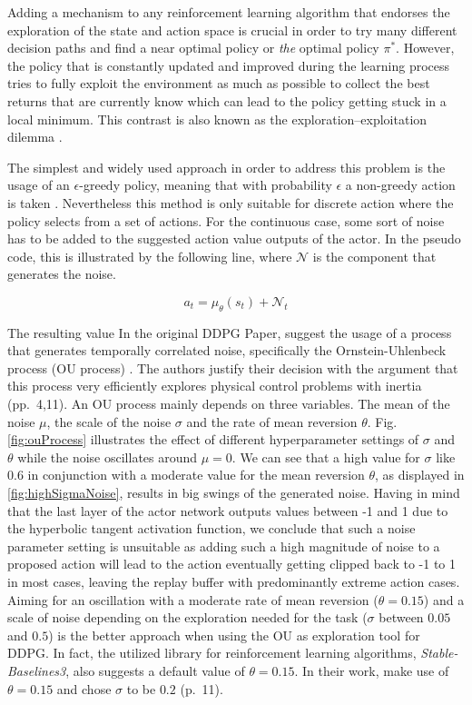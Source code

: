 Adding a mechanism to any reinforcement learning algorithm that endorses the exploration of the state and action space is crucial in order to try many different decision paths and find a near optimal policy or \textit{the} optimal policy $\pi^*$. However, the policy that is constantly updated and improved during the learning process tries to fully exploit the environment as much as possible to collect the best returns that are currently know which can lead to the policy getting stuck in a local minimum. This contrast is also known as the exploration–exploitation dilemma \cite[p.~3]{Sutton1998}.
\par
The simplest and widely used approach in order to address this problem is the usage of an $\epsilon$-greedy policy, meaning that with probability $\epsilon$ a non-greedy action is taken \cite[p.~100]{Sutton1998}. Nevertheless this method is only suitable for discrete action where the policy selects from a set of actions. For the continuous case, some sort of noise has to be added to the suggested action value outputs of the actor. In the pseudo code, this is illustrated by the following line, where $\mathcal{N}$ is the component that generates the noise.
\par
\begin{equation*}
    a_t = \mu_\theta(s_t) + \mathcal{N}_t
\end{equation*}
\par 
The resulting value 
In the original DDPG Paper, \cite{lillicrap2019continuous} suggest the usage of a process that generates temporally correlated noise, specifically the Ornstein-Uhlenbeck process (OU process) \cite[]{uhlenbeck1930theory}. The authors justify their decision with the argument that this process very efficiently explores physical control problems with inertia (pp.~4,11). An OU process mainly depends on three variables. The mean of the noise $\mu$, the scale of the noise $\sigma$ and the rate of mean reversion $\theta$. Fig. \ref{fig:ouProcess} illustrates the effect of different hyperparameter settings of $\sigma$ and $\theta$ while the noise oscillates around $\mu=0$. We can see that a high value for $\sigma$ like $0.6$ in conjunction with a moderate value for the mean reversion $\theta$, as displayed in \ref{fig:highSigmaNoise}, results in big swings of the generated noise. Having in mind that the last layer of the actor network outputs values between -1 and 1 due to the hyperbolic tangent activation function, we conclude that such a noise parameter setting is unsuitable as adding such a high magnitude of noise to a proposed action will lead to the action eventually getting clipped back to -1 to 1 in most cases, leaving the replay buffer with predominantly extreme action cases. Aiming for an oscillation with a moderate rate of mean reversion ($\theta = 0.15$) and a scale of noise depending on the exploration needed for the task ($\sigma$ between $0.05$ and $0.5$) is the better approach when using the OU as exploration tool for DDPG. In fact, the utilized library for reinforcement learning algorithms, \textit{Stable-Baselines3}, also suggests a default value of $\theta = 0.15$. In their work, \cite{lillicrap2019continuous} make use of $\theta = 0.15$ and chose $\sigma$ to be $0.2$ (p.~11).
